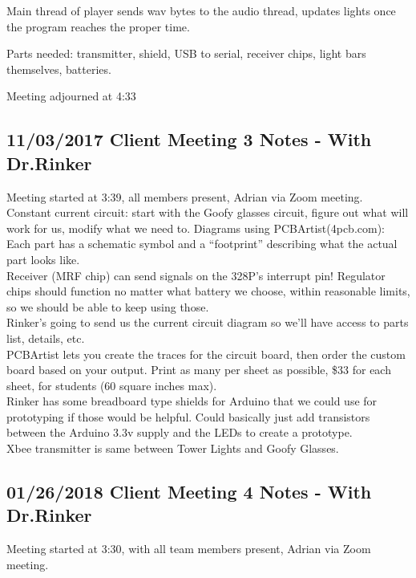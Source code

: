 \documentclass[12pt]{article}
\begin{document}
Main thread of player sends wav bytes to the audio thread, updates lights once the program reaches the proper time. 

Parts needed: transmitter, shield, USB to serial, receiver chips, light bars themselves, batteries. 

Meeting adjourned at 4:33

	\clearpage
	\subsection{11/03/2017 Client Meeting 3 Notes - With Dr.Rinker}
	
	\noindent
	Meeting started at 3:39, all members present, Adrian via Zoom meeting.\\
	
	\noindent
	Constant current circuit: start with the Goofy glasses circuit, figure out what will work for us, 			modify what we need to. Diagrams using PCBArtist(4pcb.com): Each part has a schematic symbol and a 			“footprint” describing what the actual part looks like.\\

	\noindent
	Receiver (MRF chip) can send signals on the 328P’s interrupt pin! Regulator chips should function no 		matter what battery we choose, within reasonable limits, so we should be able to keep using those.\\ 
	
	\noindent	
	Rinker’s going to send us the current circuit diagram so we’ll have access to parts list, details, etc.\\ 
	
	\noindent
	PCBArtist lets you create the traces for the circuit board, then order the custom board based on your 		output. Print as many per sheet as possible, \$33 for each sheet, for students (60 square inches max).\\
	
	\noindent
	Rinker has some breadboard type shields for Arduino that we could use for prototyping if those would be 	helpful. Could basically just add transistors between the Arduino 3.3v supply and the LEDs to create a 		prototype.\\
	 
	\noindent	
	Xbee transmitter is same between Tower Lights and Goofy Glasses.\\ 	

	\clearpage
	
	\subsection{01/26/2018 Client Meeting 4 Notes - With Dr.Rinker}
	Meeting started at 3:30, with all team members present, Adrian via Zoom meeting.
	
\end{document}
